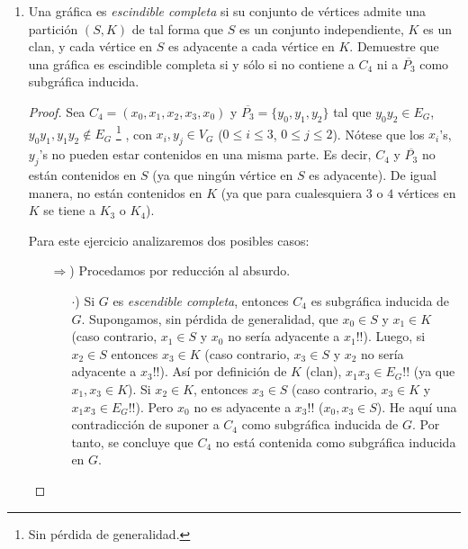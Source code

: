 \documentclass{article}
\begin{document}
\begin{enumerate}
  \item Una gr\'afica es \textit{escindible completa} si su conjunto de
    v\'ertices admite una partici\'on $(S,K)$ de tal forma que $S$ es un
    conjunto independiente, $K$ es un clan, y cada v\'ertice en $S$ es adyacente
    a cada v\'ertice en $K$. Demuestre que una gr\'afica es escindible
    completa si y s\'olo si no contiene a $C_4$ ni a $\overline{P_3}$ como
    subgr\'afica inducida. 
    
    \renewcommand\qedsymbol{QED}
    \begin{proof}
      Sea $C_4 = (x_0, x_1, x_2, x_3, x_0)$ y $\overline{P_3} = \{y_0, y_1, y_2\}$
      tal que $y_0 y_2 \in E_G$, $y_0 y_1, y_1 y_2 \notin E_G$ \footnote{Sin pérdida de generalidad.}
      , con $x_i, y_j \in V_G$ ($0 \leq i \leq 3$, $0 \leq j \leq 2$). 
      N\'otese que los $x_i$'s, $y_j$'s no pueden estar contenidos en una misma parte. 
      Es decir, $C_4$ y $\overline{P_3}$ no est\'an contenidos en $S$ (ya que ning\'un
      v\'ertice en $S$ es adyacente). De igual manera, no est\'an contenidos en $K$
      (ya que para cualesquiera $3$ o $4$ v\'ertices en $K$ se tiene a $K_3$ o $K_4$).

      Para este ejercicio analizaremos dos posibles casos:
      \begin{itemize}
        \item[$\Rightarrow$)] Procedamos por reducción al absurdo.
          \begin{itemize}
            \item[$\cdot$)] Si $G$ es \textit{escendible completa}, entonces $C_4$ es
              subgr\'afica inducida de $G$.
              Supongamos, sin p\'erdida de generalidad, que $x_0 \in S$ y $x_1 \in K$
              (caso contrario, $x_1 \in S$ y $x_0$ no ser\'ia adyacente a $x_1$!!).
              Luego, si $x_2 \in S$ entonces $x_3 \in K$ (caso contrario, $x_3 \in S$
              y $x_2$ no ser\'ia adyacente a $x_3$!!). 
              As\'i por definici\'on de $K$ (clan), $x_1 x_3 \in E_G$!!
              (ya que $x_1, x_3 \in K$). 
              Si $x_2 \in K$, entonces $x_3 \in S$ (caso contrario, $x_3 \in K$ y
              $x_1 x_3 \in E_G$!!). Pero $x_0$ no es adyacente a $x_3$!! ($x_0, x_3
              \in S$). He aqu\'i una contradicci\'on de suponer a $C_4$ como subgr\'afica
              inducida de $G$.
              Por tanto, se concluye que $C_4$ no est\'a contenida como subgr\'afica
              inducida en $G$. 


\end{itemize}
\end{itemize}
\end{proof}
\end{enumerate}
\end{document}
